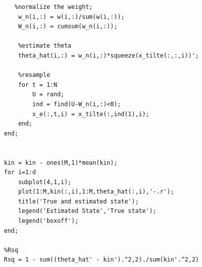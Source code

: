 \documentclass[12pt,letterpaper]{article}
\begin{document}
\begin{lstlisting}
   %normalize the weight;
    w_n(i,:) = w(i,:)/sum(w(i,:));
    W_n(i,:) = cumsum(w_n(i,:));
    
    %estimate theta
    theta_hat(i,:) = w_n(i,:)*squeeze(x_tilte(:,:,i))';    

    %resample
    for t = 1:N
        U = rand;
        ind = find(U-W_n(i,:)<0);
        x_e(:,t,i) = x_tilte(:,ind(1),i);
    end;
end;


kin = kin - ones(M,1)*mean(kin);
for i=1:d
    subplot(4,1,i);
    plot(1:M,kin(:,i),1:M,theta_hat(:,i),'-.r');
    title('True and estimated state');
    legend('Estimated State','True state');
    legend('boxoff');
end;

%Rsq
Rsq = 1 - sum((theta_hat' - kin').^2,2)./sum(kin'.^2,2)



  \end{lstlisting}
\end{document}
